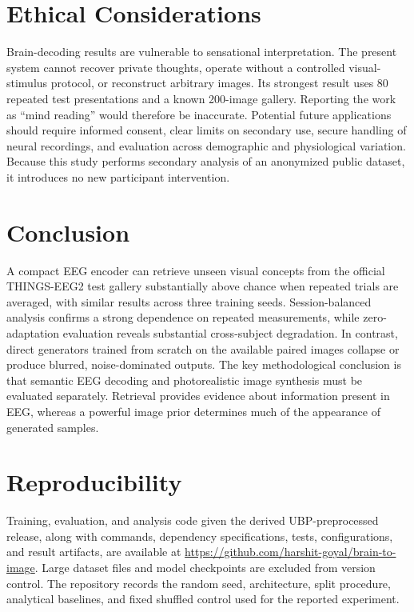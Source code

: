 \documentclass[10pt]{article}
\begin{document}
\section{Ethical Considerations}

Brain-decoding results are vulnerable to sensational interpretation. The
present system cannot recover private thoughts, operate without a controlled
visual-stimulus protocol, or reconstruct arbitrary images. Its strongest
result uses 80 repeated test presentations and a known 200-image gallery.
Reporting the work as ``mind reading'' would therefore be inaccurate.
Potential future applications should require informed consent, clear limits
on secondary use, secure handling of neural recordings, and evaluation across
demographic and physiological variation. Because this study performs
secondary analysis of an anonymized public dataset, it introduces no new
participant intervention.

\section{Conclusion}

A compact EEG encoder can retrieve unseen visual concepts from the official
THINGS-EEG2 test gallery substantially above chance when repeated trials are
averaged, with similar results across three training seeds. Session-balanced
analysis confirms a strong dependence on repeated measurements, while
zero-adaptation evaluation reveals substantial cross-subject degradation. In
contrast, direct generators trained from scratch on the available paired
images collapse or produce blurred, noise-dominated outputs. The key
methodological conclusion is that semantic EEG decoding and photorealistic
image synthesis must be evaluated separately. Retrieval provides evidence
about information present in EEG, whereas a powerful image prior determines
much of the appearance of generated samples.

\section*{Reproducibility}

Training, evaluation, and analysis code given the derived UBP-preprocessed
release, along with commands, dependency specifications, tests, configurations,
and result artifacts, are available at
\url{https://github.com/harshit-goyal/brain-to-image}. Large dataset files and
model checkpoints are excluded from version control. The repository records
the random seed, architecture, split procedure, analytical baselines, and
fixed shuffled control used for the reported experiment.
\end{document}
